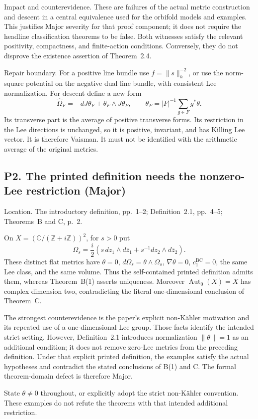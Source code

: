 \documentclass[10pt]{article}
\begin{document}
Impact and counterevidence. These are failures of the actual metric construction and descent in a central equivalence used for the orbifold models and examples. This justifies Major severity for that proof component; it does not require the headline classification theorems to be false. Both witnesses satisfy the relevant positivity, compactness, and finite-action conditions. Conversely, they do not disprove the existence assertion of Theorem 2.4.\par
Repair boundary. For a positive line bundle use \(f=\|s\|_h^{-2}\), or use the norm-square potential on the negative dual line bundle, with consistent Lee normalization. For descent define a new form \[\widehat\Omega_F=-dJ\theta_F+\theta_F\wedge J\theta_F,
 \qquad \theta_F=|F|^{-1}\sum_{g\in F}g^*\theta.\] Its transverse part is the average of positive transverse forms. Its restriction in the Lee directions is unchanged, so it is positive, invariant, and has Killing Lee vector. It is therefore Vaisman. It must not be identified with the arithmetic average of the original metrics.\par
\subsection*{P2. The printed definition needs the nonzero-Lee restriction (Major)}
Location. The introductory definition, pp. 1–2; Definition 2.1, pp. 4–5; Theorems B and C, p. 2.\par
On \(X=(\mathbb C/(\mathbb Z+i\mathbb Z))^2\), for \(s>0\) put \[\Omega_s=\frac{i}{2}
   \left(s\,dz_1\wedge d\bar z_1+
                  s^{-1}dz_2\wedge d\bar z_2\right).\] These distinct flat metrics have \(\theta=0\), \(d\Omega_s=\theta\wedge\Omega_s\), \(\nabla\theta=0\), \(c_1^{\mathrm{BC}}=0\), the same Lee class, and the same volume. Thus the self-contained printed definition admits them, whereas Theorem B(1) asserts uniqueness. Moreover \(\operatorname{Aut}_0(X)=X\) has complex dimension two, contradicting the literal one-dimensional conclusion of Theorem C.\par
The strongest counterevidence is the paper’s explicit non-Kähler motivation and its repeated use of a one-dimensional Lee group. Those facts identify the intended strict setting. However, Definition 2.1 introduces normalization \(\|\theta\|=1\) as an additional condition; it does not remove zero-Lee metrics from the preceding definition. Under that explicit printed definition, the examples satisfy the actual hypotheses and contradict the stated conclusions of B(1) and C. The formal theorem-domain defect is therefore Major.\par
State \(\theta\ne0\) throughout, or explicitly adopt the strict non-Kähler convention. These examples do not refute the theorems with that intended additional restriction.\par
\end{document}

